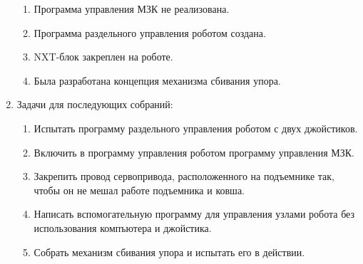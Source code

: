 \begin{enumerate}
\begin{enumerate}
		\item Программа управления МЗК не реализована.
		
		\item Программа раздельного управления роботом создана.
		
		\item NXT-блок закреплен на роботе.
		
		\item Была разработана концепция механизма сбивания упора.
		
	\end{enumerate}
	
	\item Задачи для последующих собраний:
	\begin{enumerate}
		\item Испытать программу раздельного управления роботом с двух джойстиков.
		
		\item Включить в программу управления роботом программу управления МЗК.
		
		\item Закрепить провод сервопривода, расположенного на подъемнике так, чтобы он не мешал работе подъемника и ковша.
		
		\item Написать вспомогательную программу для управления узлами робота без использования компъютера и джойстика.
		
		\item Собрать механизм сбивания упора и испытать его в действии.
		
	\end{enumerate}     
\end{enumerate}
\fillpage

